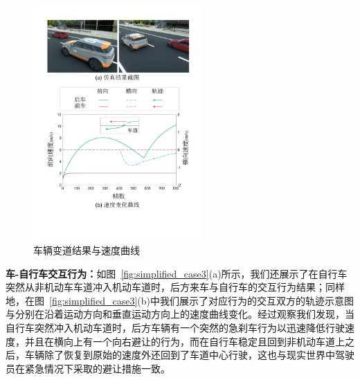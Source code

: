 \begin{figure}[!tbh]
\centering
\includegraphics[width=0.58\textwidth]{figure/simplified/simplified_case2_vert_cn v2.pdf}
\caption[车辆变道结果与速度曲线]{
车辆变道结果与速度曲线
}
\label{fig:simplified_case2}
\end{figure}

\textbf{车-自行车交互行为：}如图~\ref{fig:simplified_case3}(a)所示，我们还展示了在自行车突然从非机动车车道冲入机动车道时，后方来车与自行车的交互行为结果；同样地，在图~\ref{fig:simplified_case3}(b)中我们展示了对应行为的交互双方的轨迹示意图与分别在沿着运动方向和垂直运动方向上的速度曲线变化。经过观察我们发现，当自行车突然冲入机动车道时，后方车辆有一个突然的急刹车行为以迅速降低行驶速度，并且在横向上有一个向右避让的行为，而在自行车稳定且回到非机动车道上之后，车辆除了恢复到原始的速度外还回到了车道中心行驶，这也与现实世界中驾驶员在紧急情况下采取的避让措施一致。


